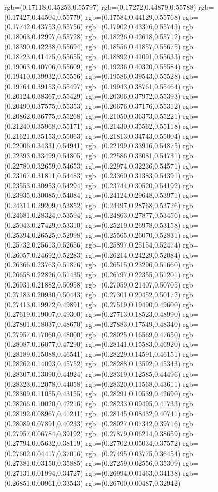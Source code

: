 {{		rgb=(0.17118,0.45253,0.55797)
		rgb=(0.17272,0.44879,0.55788)
		rgb=(0.17427,0.44504,0.55779)
		rgb=(0.17584,0.44129,0.55768)
		rgb=(0.17742,0.43753,0.55756)
		rgb=(0.17902,0.43376,0.55743)
		rgb=(0.18063,0.42997,0.55728)
		rgb=(0.18226,0.42618,0.55712)
		rgb=(0.18390,0.42238,0.55694)
		rgb=(0.18556,0.41857,0.55675)
		rgb=(0.18723,0.41475,0.55655)
		rgb=(0.18892,0.41091,0.55633)
		rgb=(0.19063,0.40706,0.55609)
		rgb=(0.19236,0.40320,0.55584)
		rgb=(0.19410,0.39932,0.55556)
		rgb=(0.19586,0.39543,0.55528)
		rgb=(0.19764,0.39153,0.55497)
		rgb=(0.19943,0.38761,0.55464)
		rgb=(0.20124,0.38367,0.55429)
		rgb=(0.20306,0.37972,0.55393)
		rgb=(0.20490,0.37575,0.55353)
		rgb=(0.20676,0.37176,0.55312)
		rgb=(0.20862,0.36775,0.55268)
		rgb=(0.21050,0.36373,0.55221)
		rgb=(0.21240,0.35968,0.55171)
		rgb=(0.21430,0.35562,0.55118)
		rgb=(0.21621,0.35153,0.55063)
		rgb=(0.21813,0.34743,0.55004)
		rgb=(0.22006,0.34331,0.54941)
		rgb=(0.22199,0.33916,0.54875)
		rgb=(0.22393,0.33499,0.54805)
		rgb=(0.22586,0.33081,0.54731)
		rgb=(0.22780,0.32659,0.54653)
		rgb=(0.22974,0.32236,0.54571)
		rgb=(0.23167,0.31811,0.54483)
		rgb=(0.23360,0.31383,0.54391)
		rgb=(0.23553,0.30953,0.54294)
		rgb=(0.23744,0.30520,0.54192)
		rgb=(0.23935,0.30085,0.54084)
		rgb=(0.24124,0.29648,0.53971)
		rgb=(0.24311,0.29209,0.53852)
		rgb=(0.24497,0.28768,0.53726)
		rgb=(0.24681,0.28324,0.53594)
		rgb=(0.24863,0.27877,0.53456)
		rgb=(0.25043,0.27429,0.53310)
		rgb=(0.25219,0.26978,0.53158)
		rgb=(0.25394,0.26525,0.52998)
		rgb=(0.25565,0.26070,0.52831)
		rgb=(0.25732,0.25613,0.52656)
		rgb=(0.25897,0.25154,0.52474)
		rgb=(0.26057,0.24692,0.52283)
		rgb=(0.26214,0.24229,0.52084)
		rgb=(0.26366,0.23763,0.51876)
		rgb=(0.26515,0.23296,0.51660)
		rgb=(0.26658,0.22826,0.51435)
		rgb=(0.26797,0.22355,0.51201)
		rgb=(0.26931,0.21882,0.50958)
		rgb=(0.27059,0.21407,0.50705)
		rgb=(0.27183,0.20930,0.50443)
		rgb=(0.27301,0.20452,0.50172)
		rgb=(0.27413,0.19972,0.49891)
		rgb=(0.27519,0.19490,0.49600)
		rgb=(0.27619,0.19007,0.49300)
		rgb=(0.27713,0.18523,0.48990)
		rgb=(0.27801,0.18037,0.48670)
		rgb=(0.27883,0.17549,0.48340)
		rgb=(0.27957,0.17060,0.48000)
		rgb=(0.28025,0.16569,0.47650)
		rgb=(0.28087,0.16077,0.47290)
		rgb=(0.28141,0.15583,0.46920)
		rgb=(0.28189,0.15088,0.46541)
		rgb=(0.28229,0.14591,0.46151)
		rgb=(0.28262,0.14093,0.45752)
		rgb=(0.28288,0.13592,0.45343)
		rgb=(0.28307,0.13090,0.44924)
		rgb=(0.28319,0.12585,0.44496)
		rgb=(0.28323,0.12078,0.44058)
		rgb=(0.28320,0.11568,0.43611)
		rgb=(0.28309,0.11055,0.43155)
		rgb=(0.28291,0.10539,0.42690)
		rgb=(0.28266,0.10020,0.42216)
		rgb=(0.28233,0.09495,0.41733)
		rgb=(0.28192,0.08967,0.41241)
		rgb=(0.28145,0.08432,0.40741)
		rgb=(0.28089,0.07891,0.40233)
		rgb=(0.28027,0.07342,0.39716)
		rgb=(0.27957,0.06784,0.39192)
		rgb=(0.27879,0.06214,0.38659)
		rgb=(0.27794,0.05632,0.38119)
		rgb=(0.27702,0.05034,0.37572)
		rgb=(0.27602,0.04417,0.37016)
		rgb=(0.27495,0.03775,0.36454)
		rgb=(0.27381,0.03150,0.35885)
		rgb=(0.27259,0.02556,0.35309)
		rgb=(0.27131,0.01994,0.34727)
		rgb=(0.26994,0.01463,0.34138)
		rgb=(0.26851,0.00961,0.33543)
		rgb=(0.26700,0.00487,0.32942)
	  }
}